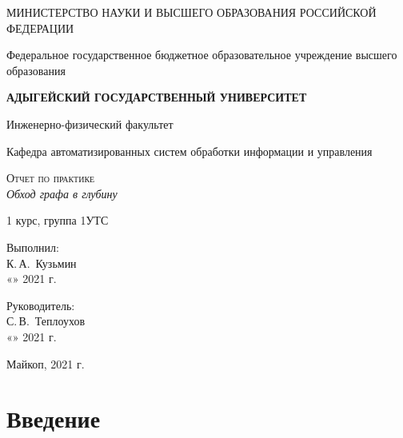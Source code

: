 \documentclass[12pt,a4paper]{scrartcl}
\begin{document}
\begin{titlepage}
		\begin{center}
			\large
			МИНИСТЕРСТВО НАУКИ И ВЫСШЕГО ОБРАЗОВАНИЯ РОССИЙСКОЙ ФЕДЕРАЦИИ
			
			Федеральное государственное бюджетное образовательное учреждение высшего образования
			
			\textbf{АДЫГЕЙСКИЙ ГОСУДАРСТВЕННЫЙ УНИВЕРСИТЕТ}
			\vspace{0.25cm}
			
			Инженерно-физический факультет
			
			Кафедра автоматизированных систем обработки информации и управления
			\vfill

			\vfill
			
			\textsc{Отчет по практике}\\[5mm]
			
			{\LARGE \textit{Обход графа в глубину}}
			\bigskip
			
			1 курс, группа 1УТС
		\end{center}
		\vfill
		
		\newlength{\ML}
		\hfill\begin{minipage}{0.5\textwidth}
			Выполнил:\\
			\underline{\hspace{\ML}} К.\,А.~Кузьмин\\
			«\underline{\hspace{0.7cm}}» \underline{\hspace{2cm}} 2021 г.
		\end{minipage}%
		\bigskip
		
		\hfill\begin{minipage}{0.5\textwidth}
			Руководитель:\\
			\underline{\hspace{\ML}} С.\,В.~Теплоухов\\
			«\underline{\hspace{0.7cm}}» \underline{\hspace{2cm}} 2021 г.
		\end{minipage}%
		\vfill
		
		\begin{center}
			Майкоп, 2021 г.
		\end{center}
	\end{titlepage}

\section{Введение}
\label{sec:intro}
\end{document}

